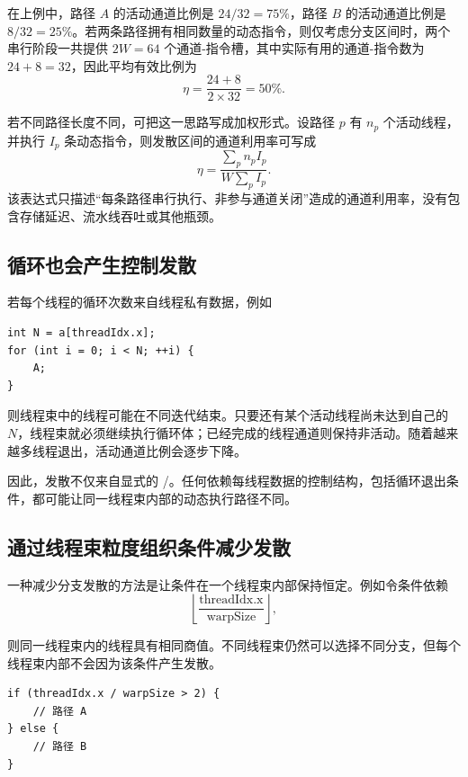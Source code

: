 在上例中，路径 \(A\) 的活动通道比例是 \(24/32=75\%\)，路径 \(B\) 的活动通道比例是 \(8/32=25\%\)。若两条路径拥有相同数量的动态指令，则仅考虑分支区间时，两个串行阶段一共提供 \(2W=64\) 个通道-指令槽，其中实际有用的通道-指令数为 \(24+8=32\)，因此平均有效比例为
\[
\eta=\frac{24+8}{2\times32}=50\%.
\]

若不同路径长度不同，可把这一思路写成加权形式。设路径 \(p\) 有 \(n_p\) 个活动线程，并执行 \(I_p\) 条动态指令，则发散区间的通道利用率可写成
\[
\eta=\frac{\sum_p n_p I_p}{W\sum_p I_p}.
\]
该表达式只描述“每条路径串行执行、非参与通道关闭”造成的通道利用率，没有包含存储延迟、流水线吞吐或其他瓶颈。

\subsection{循环也会产生控制发散}

\par\noindent\begin{minipage}{\linewidth}
若每个线程的循环次数来自线程私有数据，例如

\begin{lstlisting}[caption={每线程循环次数不同造成的发散}]
int N = a[threadIdx.x];
for (int i = 0; i < N; ++i) {
    A;
}
\end{lstlisting}
\end{minipage}\par

则线程束中的线程可能在不同迭代结束。只要还有某个活动线程尚未达到自己的 \(N\)，线程束就必须继续执行循环体；已经完成的线程通道则保持非活动。随着越来越多线程退出，活动通道比例会逐步下降。

因此，发散不仅来自显式的 /。任何依赖每线程数据的控制结构，包括循环退出条件，都可能让同一线程束内部的动态执行路径不同。

\subsection{通过线程束粒度组织条件减少发散}

一种减少分支发散的方法是让条件在一个线程束内部保持恒定。例如令条件依赖
\[
\left\lfloor\frac{\text{threadIdx.x}}{\text{warpSize}}\right\rfloor,
\]
\par\noindent\begin{minipage}{\linewidth}
则同一线程束内的线程具有相同商值。不同线程束仍然可以选择不同分支，但每个线程束内部不会因为该条件产生发散。

\begin{lstlisting}[caption={线程束粒度的分支条件}]
if (threadIdx.x / warpSize > 2) {
    // 路径 A
} else {
    // 路径 B
}
\end{lstlisting}
\end{minipage}\par

